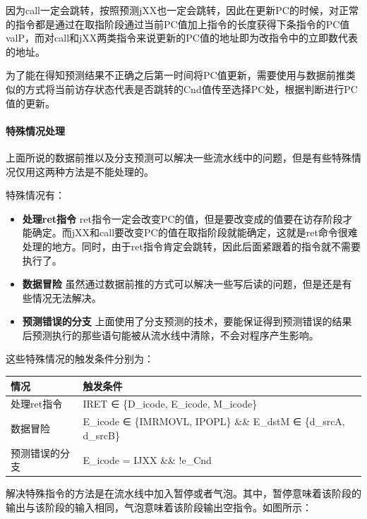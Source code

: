 \documentclass[12pt]{article}
\begin{document}
\begin{CJK*}{GB}{gbsn}
因为call一定会跳转，按照预测jXX也一定会跳转，因此在更新PC的时候，对正常的指令都是通过在取指阶段通过当前PC值加上指令的长度获得下条指令的PC值valP，而对call和jXX两类指令来说更新的PC值的地址即为改指令中的立即数代表的地址。

为了能在得知预测结果不正确之后第一时间将PC值更新，需要使用与数据前推类似的方式将当前访存状态代表是否跳转的Cnd值传至选择PC处，根据判断进行PC值的更新。

\paragraph{特殊情况处理}\label{ux7279ux6b8aux60c5ux51b5ux5904ux7406}

上面所说的数据前推以及分支预测可以解决一些流水线中的问题，但是有些特殊情况仅用这两种方法是不能处理的。

特殊情况有：

\begin{itemize}
\itemsep1pt\parskip0pt
\item
  \textbf{处理ret指令}
  ret指令一定会改变PC的值，但是要改变成的值要在访存阶段才能确定。而jXX和call要改变PC的值在取指阶段就能确定，这就是ret命令很难处理的地方。同时，由于ret指令肯定会跳转，因此后面紧跟着的指令就不需要执行了。
\item
  \textbf{数据冒险}
  虽然通过数据前推的方式可以解决一些写后读的问题，但是还是有些情况无法解决。
\item
  \textbf{预测错误的分支}
  上面使用了分支预测的技术，要能保证得到预测错误的结果后预测执行的那些语句能被从流水线中清除，不会对程序产生影响。
\end{itemize}

这些特殊情况的触发条件分别为：

\begin{longtable}[c]{@{}ll@{}}
\toprule
情况 & 触发条件\tabularnewline
\midrule
\endhead
处理ret指令 & IRET ∈ \{D\_icode, E\_icode, M\_icode\}\tabularnewline
数据冒险 & E\_icode ∈ \{IMRMOVL, IPOPL\} \&\& E\_dstM ∈ \{d\_srcA,
d\_srcB\}\tabularnewline
预测错误的分支 & E\_icode = IJXX \&\& !e\_Cnd\tabularnewline
\bottomrule
\end{longtable}

解决特殊指令的方法是在流水线中加入暂停或者气泡。其中，暂停意味着该阶段的输出与该阶段的输入相同，气泡意味着该阶段输出空指令。如图所示：


\end{CJK*}
\end{document}
